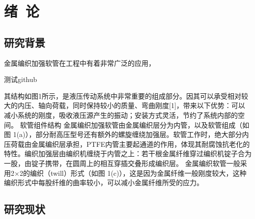 


\chapter{绪~论}
\label{chap:introduintroduction}
\section{研究背景}
金属编织加强软管在工程中有着非常广泛的应用，

测试github



其结构如图1所示，是液压传动系统中非常重要的组成部分。因其可以承受相对较大的内压、轴向荷载，同时保持较小的质量、弯曲刚度[1]，带来以下优势：可以减小系统的刚度，吸收液压源产生的振动；安装方式灵活，节约了系统内部的空间。
软管组件结构
金属编织加强软管由金属编织层分为内管，以及软管组成（如图 1(a)），部分耐高压型号还有额外的螺旋缠绕加强层。软管工作时，绝大部分内压荷载由金属编织层承担，PTFE内管主要起通道的作用，体现其耐腐蚀抗老化的特性。编织加强层由编织机缠绕于内管之上：若干根金属纤维穿过编织机锭子合为一股，由锭子携带，在圆周上的相互穿插交叠形成编织层。
金属编织软管一般采用2×2的编织（twill）形式（如图 1(c)），这是因为金属纤维一般刚度较大，这种编织形式中每股纤维的曲率较小，可以减小金属纤维所受的应力。

 	 	 
					
\section{研究现状}



